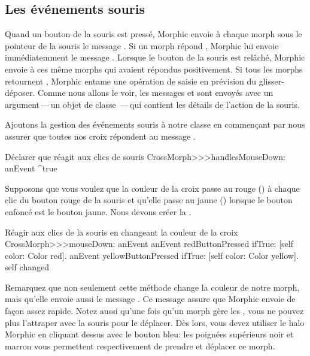 \documentclass[a4paper,10pt,twoside]{book}
\begin{document}
\subsection{Les \'ev\'enements souris}

Quand un bouton de la souris est press\'e, Morphic envoie \`a chaque
morph sous le pointeur de la souris le message
. Si un morph r\'epond , Morphic lui
envoie imm\'ediatemment le message . Lorsque
le bouton de la souris est rel\^ach\'e, Morphic envoie
  \`a ces m\^eme morphs qui avaient r\'epondus
positivement. Si tous les morphs retournent , Morphic entame
une op\'eration de
saisie en pr\'evision du glisser-d\'eposer.
Comme nous allons le voir, les messages  et 
sont envoy\'es avec un argument\,---\,un objet de classe
\,---\,qui contient les d\'etails de l'action de la souris.

Ajoutons la gestion des \'ev\'enements souris \`a notre classe
 en commen\c{c}ant par nous assurer que toutes nos
croix r\'epondent  au message .

\begin{method}{D\'eclarer que  r\'eagit aux clics de souris}
CrossMorph>>>handlesMouseDown: anEvent
	^true
\end{method}

Supposons que vous voulez que la couleur de la croix passe au rouge
()
\`a chaque clic du bouton rouge de la souris et qu'elle passe au jaune
()
lorsque le bouton enfonc\'e est le bouton jaune. 
Nous devons cr\'eer la .

\begin{method}[mouseDown]{R\'eagir aux clics de la souris en changeant la couleur de la croix}
CrossMorph>>>mouseDown: anEvent
	anEvent redButtonPressed
		ifTrue: [self color: Color red].
	anEvent yellowButtonPressed
		ifTrue: [self color: Color yellow].
	self changed
\end{method}

Remarquez que non seulement cette m\'ethode change la couleur de notre
morph, mais qu'elle envoie aussi le message .
Ce message assure que Morphic envoie 
de fa\c{c}on assez rapide.
Notez aussi qu'une fois qu'un morph g\`ere les , vous ne pouvez plus l'attraper avec la souris pour le d\'eplacer.
D\`es lors, vous devez utiliser le halo Morphic en cliquant dessus avec le
bouton bleu: les poign\'ees sup\'erieurs noir \grabHandle{}
et marron \moveHandle{} 
vous permettent respectivement de prendre et d\'eplacer ce morph.
\end{document}

